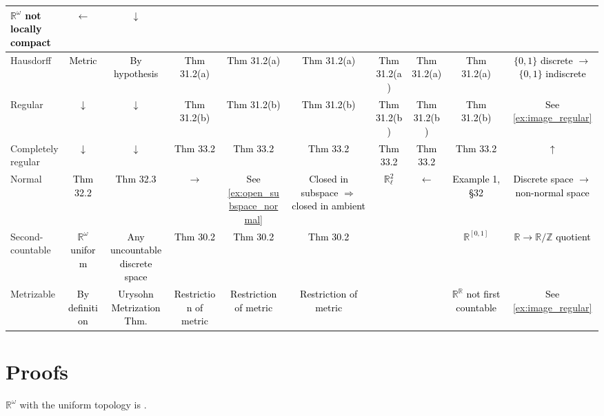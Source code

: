 \documentclass[11pt]{article}
\providecommand{\GridYes}[1]{\cellcolor{green!30}\textcolor{black}{#1}}
\providecommand{\GridNo}[1]{\cellcolor{red!27}\textcolor{black}{#1}}
\begin{document}
\begin{center}
{\begin{tabular}{|l|*{9}{c|}}
 \GridNo{$\mathbb R^\omega$ not 
 locally compact} & \GridNo{$\leftarrow$} & \GridNo{$\downarrow$} \\
\hline
Hausdorff
 & \GridYes{Metric} & \GridYes{By hypothesis}
 & \GridYes{Thm 31.2(a)} & \GridYes{Thm 31.2(a)}
 & \GridYes{Thm 31.2(a)} & \GridYes{Thm 31.2(a)}
 & \GridYes{Thm 31.2(a)} & \GridYes{Thm 31.2(a)}
 & \GridNo{$\{0,1\}$ discrete $\to$ 
 $\{0,1\}$ indiscrete} \\
\hline
Regular
 & \GridYes{$\downarrow$} & \GridYes{$\downarrow$}
 & \GridYes{Thm 31.2(b)} & \GridYes{Thm 31.2(b)}
 & \GridYes{Thm 31.2(b)} & \GridYes{Thm 31.2(b)}
 & \GridYes{Thm 31.2(b)} & \GridYes{Thm 31.2(b)} & 
 \GridNo{See \cref{ex:image_regular}}\\
\hline
Completely regular
 & \GridYes{$\downarrow$} & \GridYes{$\downarrow$}
 & \GridYes{Thm 33.2} & \GridYes{Thm 33.2}
 & \GridYes{Thm 33.2} & \GridYes{Thm 33.2}
 & \GridYes{Thm 33.2} & \GridYes{Thm 33.2} & 
 \GridNo{$\uparrow$} \\
\hline
Normal
 & \GridYes{Thm 32.2} & \GridYes{Thm 32.3}
 & \GridNo{$\rightarrow$} & \GridNo{See 
\cref{ex:open_subspace_normal}}  & 
 \GridYes{Closed in subspace $\Rightarrow$ 
closed in ambient}& \GridNo{$\mathbb R_\ell^2$} & 
 \GridNo{$\leftarrow$}& \GridNo{Example 1, \S32} & 
 \GridNo{Discrete space $\to$ 
 non-normal space} \\
\hline
Second-countable
 & \GridNo{$\mathbb R^\omega$ uniform} & 
 \GridNo{Any uncountable discrete space}
 & \GridYes{Thm 30.2} & \GridYes{Thm 30.2}
 & \GridYes{Thm 30.2} & &
 & \GridNo{$\mathbb R^{[0,1]}$} &  
 \GridNo{$\mathbb R \to \mathbb R/\mathbb Z$ quotient} \\
\hline
Metrizable
 & \GridYes{By definition} & 
 \GridNo{Urysohn Metrization Thm.}
 & \GridYes{Restriction of metric} & \GridYes{Restriction of metric}
 & \GridYes{Restriction of metric} & & & 
 \GridNo{$\mathbb R^{\mathbb R}$ not first countable} & 
 \GridNo{See \cref{ex:image_regular}} \\
\hline
\end{tabular}%
}
\end{center}
\endgroup

\newpage 

\section{Proofs}

\begin{prop}\label{prop:omega_uniform_connectedness}
    $\mathbb R^\omega$ with the uniform topology 
    is . 
\end{prop}
\end{document}
